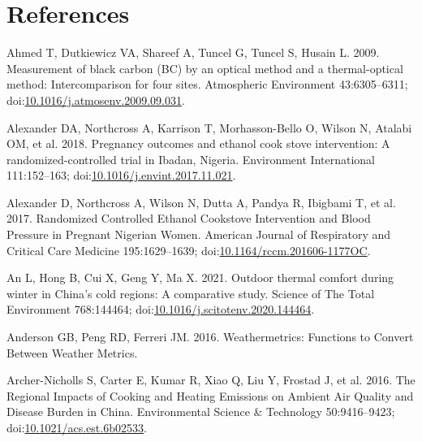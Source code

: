 \documentclass[
  letterpaper,
  DIV=11,
  numbers=noendperiod]{scrartcl}
\newlength{\cslhangindent}
\newlength{\cslentryspacingunit} %
\newenvironment{CSLReferences}[2] %
 {%
  \setlength{\parindent}{0pt}
  \ifodd #1
  \let\oldpar\par
  \def\par{\hangindent=\cslhangindent\oldpar}
  \fi
  \setlength{\parskip}{#2\cslentryspacingunit}
 }%
 {}
\begin{document}
\hypertarget{references}{%
\section{References}\label{references}}

\hypertarget{refs}{}
\begin{CSLReferences}{1}{0}
\leavevmode{}%
Ahmed T, Dutkiewicz VA, Shareef A, Tuncel G, Tuncel S, Husain L. 2009.
Measurement of black carbon ({BC}) by an optical method and a
thermal-optical method: {Intercomparison} for four sites. Atmospheric
Environment 43:6305--6311;
doi:\href{https://doi.org/10.1016/j.atmosenv.2009.09.031}{10.1016/j.atmosenv.2009.09.031}.

\leavevmode{}%
Alexander DA, Northcross A, Karrison T, Morhasson-Bello O, Wilson N,
Atalabi OM, et al. 2018. Pregnancy outcomes and ethanol cook stove
intervention: {A} randomized-controlled trial in {Ibadan}, {Nigeria}.
Environment International 111:152--163;
doi:\href{https://doi.org/10.1016/j.envint.2017.11.021}{10.1016/j.envint.2017.11.021}.

\leavevmode{}%
Alexander D, Northcross A, Wilson N, Dutta A, Pandya R, Ibigbami T, et
al. 2017. Randomized {Controlled Ethanol Cookstove Intervention} and
{Blood Pressure} in {Pregnant Nigerian Women}. American Journal of
Respiratory and Critical Care Medicine 195:1629--1639;
doi:\href{https://doi.org/10.1164/rccm.201606-1177OC}{10.1164/rccm.201606-1177OC}.

\leavevmode{}%
An L, Hong B, Cui X, Geng Y, Ma X. 2021. Outdoor thermal comfort during
winter in {China}'s cold regions: {A} comparative study. Science of The
Total Environment 768:144464;
doi:\href{https://doi.org/10.1016/j.scitotenv.2020.144464}{10.1016/j.scitotenv.2020.144464}.

\leavevmode{}%
Anderson GB, Peng RD, Ferreri JM. 2016. Weathermetrics: {Functions} to
{Convert Between Weather Metrics}.

\leavevmode{}%
Archer-Nicholls S, Carter E, Kumar R, Xiao Q, Liu Y, Frostad J, et al.
2016. The {Regional Impacts} of {Cooking} and {Heating Emissions} on
{Ambient Air Quality} and {Disease Burden} in {China}. Environmental
Science \& Technology 50:9416--9423;
doi:\href{https://doi.org/10.1021/acs.est.6b02533}{10.1021/acs.est.6b02533}.


\end{CSLReferences}
\end{document}
